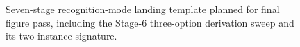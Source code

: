 \begin{figure}[tbp]
  \centering
  \caption{Seven-stage recognition-mode landing template planned for final figure pass, including the Stage-6 three-option derivation sweep and its two-instance \SigPattern{} signature.}
  \label{fig:seven-stage-template}
\end{figure}
